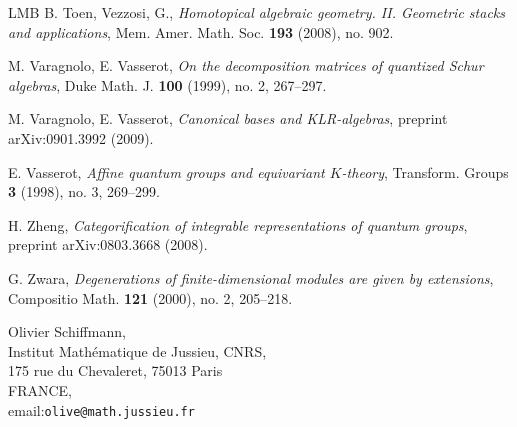 \documentclass[a4paper,10pt]{amsart}
\numberwithin{equation}{section}
\begin{document}
{\begin{thebibliography}{LMB}
B. Toen, Vezzosi, G., \emph{Homotopical algebraic geometry. II. Geometric stacks and applications},  Mem. Amer. Math. Soc.  \textbf{193}  (2008),  no. 902.

M. Varagnolo, E. Vasserot, \emph{On the decomposition matrices of quantized Schur algebras},  Duke Math. J. \textbf{100}  (1999),  no. 2, 267--297. 

M. Varagnolo, E. Vasserot, \emph{Canonical bases and KLR-algebras}, preprint  arXiv:0901.3992 (2009).

E. Vasserot, \emph{Affine quantum groups and equivariant $K$-theory}, 
Transform. Groups \textbf{3} (1998), no. 3, 269--299. 

H. Zheng, \emph{Categorification of integrable representations of quantum groups}, preprint arXiv:0803.3668 (2008).

G. Zwara, \emph{Degenerations of finite-dimensional modules are given by extensions},  Compositio Math. \textbf{121}  (2000),  no. 2, 205--218.

\end{thebibliography}}

\vspace{.2in}

\noindent
Olivier Schiffmann,\\
Institut Math\'ematique de Jussieu, CNRS,\\
175 rue du Chevaleret, 75013 Paris \\
FRANCE,\\
email:\;\texttt{olive@math.jussieu.fr}
\end{document}
